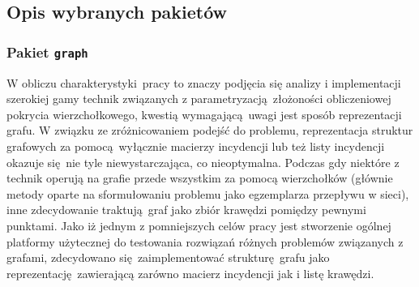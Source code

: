 \subsection{Opis wybranych pakietów}\label{ss_internals_important_packages}
\subsubsection{\textbf{Pakiet \texttt{graph}}}
\par{
  W obliczu charakterystyki pracy to znaczy podjęcia się analizy i implementacji szerokiej gamy technik związanych z parametryzacją złożoności obliczeniowej pokrycia wierzchołkowego, kwestią wymagającą uwagi jest sposób reprezentacji grafu.
  W związku ze zróżnicowaniem podejść do problemu, reprezentacja struktur grafowych za pomocą wyłącznie macierzy incydencji lub też listy incydencji okazuje się nie tyle niewystarczająca, co nieoptymalna.
  Podczas gdy niektóre z technik operują na grafie przede wszystkim za pomocą wierzchołków (głównie metody oparte na sformułowaniu problemu jako egzemplarza przepływu w sieci), inne zdecydowanie traktują graf jako zbiór krawędzi pomiędzy pewnymi punktami.
  Jako iż jednym z pomniejszych celów pracy jest stworzenie ogólnej platformy użytecznej do testowania rozwiązań różnych problemów związanych z grafami, zdecydowano się zaimplementować strukturę grafu jako reprezentację zawierającą zarówno macierz incydencji jak i listę krawędzi.
}
